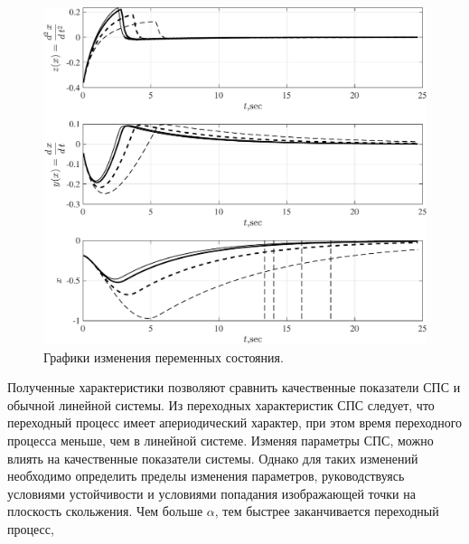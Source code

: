 \begin{figure}[!h]\centering
\includegraphics[width=1.0\linewidth]{images/VSS_P_sv_VSS_P}
\caption{ Графики изменения переменных состояния.}\label{fig:VSS_P_sv_VSS_P}
\end{figure}


Полученные характеристики позволяют сравнить качественные показатели СПС и обычной линейной системы. Из переходных характеристик СПС следует, что переходный процесс имеет апериодический характер, при этом время переходного процесса меньше, чем в линейной системе. Изменяя параметры СПС, можно влиять на качественные показатели системы. Однако для таких изменений необходимо определить пределы изменения параметров, руководствуясь условиями устойчивости и условиями попадания изображающей точки на плоскость скольжения.
Чем больше $\alpha$, тем быстрее заканчивается переходный процесс,

